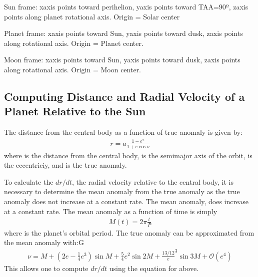 \documentclass[letterpaper,10pt,english]{sphinxmanual}
\begin{document}
\sphinxAtStartPar
Sun frame: x\sphinxhyphen{}axis points toward perihelion, y\sphinxhyphen{}axis points toward TAA=90º,
z\sphinxhyphen{}axis points along planet rotational axis. Origin = Solar center

\sphinxAtStartPar
Planet frame: x\sphinxhyphen{}axis points toward Sun, y\sphinxhyphen{}axis points toward dusk, z\sphinxhyphen{}axis
points along rotational axis. Origin = Planet center.

\sphinxAtStartPar
Moon frame: x\sphinxhyphen{}axis points toward Sun, y\sphinxhyphen{}axis points toward dusk, z\sphinxhyphen{}axis
points along rotational axis. Origin = Moon center.


\subsection{Computing Distance and Radial Velocity of a Planet Relative to the Sun}
\label{\detokenize{nexoclom2/planet_distance:computing-distance-and-radial-velocity-of-a-planet-relative-to-the-sun}}
\sphinxAtStartPar
The distance from the central body as a function of true anomaly is given by:
\begin{equation*}
\begin{split}r = a \frac{1 - e^2}{1 + e \cos \nu}\end{split}
\end{equation*}
\sphinxAtStartPar
where  is the distance from the central body,  is the semi\sphinxhyphen{}major axis of
the orbit,  is the eccentriciy, and  is the true anomaly.

\sphinxAtStartPar
To calculate the \(dr/dt\), the radial velocity relative to the central
body, it is necessary to determine the mean anomaly from the true anomaly as
the true anomaly does not increase at a constant rate. The mean anomaly,  does
increase at a constant rate. The mean anomaly as a function of time is simply
\begin{equation*}
\begin{split}M(t) = 2\pi \frac{t}{P}\end{split}
\end{equation*}
\sphinxAtStartPar
where  is the planet’s orbital period. The true anomaly can be approximated
from the mean anomaly with:G
\begin{equation*}
\begin{split}\nu = M + (2e - \frac{1}{4}e^3) \sin M + \frac{5}{4}e^2 \sin 2M +
\frac{13/12} e^3 \sin 3M + \mathcal{O}(e^4)\end{split}
\end{equation*}
\sphinxAtStartPar
This allows one to compute \(dr/dt\) using the equation for  above.
\end{document}
